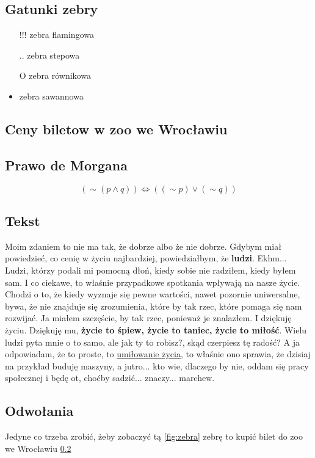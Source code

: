 \subsection{Gatunki zebry}
\begin{itemize}
    \item [!!!] zebra flamingowa
    \item [..] zebra stepowa
    \item [O] zebra równikowa
    \item zebra sawannowa
    
\end{itemize}
\subsection{Ceny biletow w zoo we Wrocławiu}

\label{tab:Ceny}
\subsection{Prawo de Morgana}
\begin{equation}
    \left ( \sim \left ( p \wedge q \right ) \right ) \Leftrightarrow \left ( \left ( \sim p \right ) \vee \left ( \sim q \right ) \right )
\end{equation}
\subsection{Tekst}
    Moim zdaniem to nie ma tak, że dobrze albo że nie dobrze. Gdybym miał powiedzieć, co cenię w życiu najbardziej, powiedziałbym, że \textbf{ludzi}. Ekhm... Ludzi, którzy podali mi pomocną dłoń, kiedy sobie nie radziłem, kiedy byłem sam. I co ciekawe, to właśnie przypadkowe spotkania wpływają na nasze życie. Chodzi o to, że kiedy wyznaje się pewne wartości, nawet pozornie uniwersalne, bywa, że nie znajduje się zrozumienia, które by tak rzec, które pomaga się nam rozwijać. Ja miałem szczęście, by tak rzec, ponieważ je znalazłem. I dziękuję życiu. Dziękuję mu, \textbf{życie to śpiew, życie to taniec, życie to miłość}. Wielu ludzi pyta mnie o to samo, ale jak ty to robisz?, skąd czerpiesz tę radość? A ja odpowiadam, że to proste, to \underline {umiłowanie życia}, to właśnie ono sprawia, że dzisiaj na przykład buduję maszyny, a jutro... kto wie, dlaczego by nie, oddam się pracy społecznej i będę ot, choćby sadzić... znaczy... marchew.
\subsection{Odwołania}
 Jedyne co trzeba zrobić, żeby zobaczyć tą \ref{fig:zebra} zebrę to kupić bilet do zoo we Wrocławiu \ref{tab:Ceny}